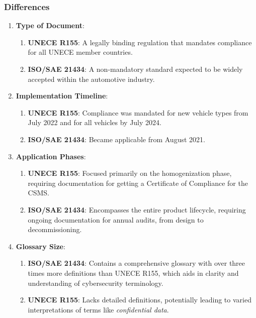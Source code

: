 \subsubsection{Differences}

\begin{enumerate}
    \item \textbf{Type of Document}:
    \begin{enumerate}
        \item \textbf{UNECE R155}: A legally binding regulation that mandates compliance for all UNECE member countries.
        \item \textbf{ISO/SAE 21434}: A non-mandatory standard expected to be widely accepted within the automotive industry.
    \end{enumerate}

    \item \textbf{Implementation Timeline}:
    \begin{enumerate}
        \item \textbf{UNECE R155}: Compliance was mandated for new vehicle types from July 2022 and for all vehicles by July 2024.
        \item \textbf{ISO/SAE 21434}: Became applicable from August 2021.
    \end{enumerate}

    \item \textbf{Application Phases}:
    \begin{enumerate}
        \item \textbf{UNECE R155}: Focused primarily on the homogenization phase, requiring documentation for getting a Certificate of Compliance for the CSMS.
        \item \textbf{ISO/SAE 21434}: Encompasses the entire product lifecycle, requiring ongoing documentation for annual audits, from design to decommissioning.
    \end{enumerate}

    \item \textbf{Glossary Size}:
    \begin{enumerate}
        \item \textbf{ISO/SAE 21434}: Contains a comprehensive glossary with over three times more definitions than UNECE R155, which aids in clarity and understanding of cybersecurity terminology.
        \item \textbf{UNECE R155}: Lacks detailed definitions, potentially leading to varied interpretations of terms like \textit{confidential data}.
    \end{enumerate}


\end{enumerate}
